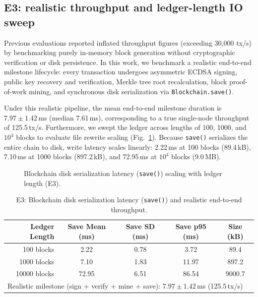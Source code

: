\documentclass[journal]{IEEEtran}
\begin{document}
\subsection{E3: realistic throughput and ledger-length IO sweep}
Previous evaluations reported inflated throughput figures (exceeding 30{,}000 tx/s)
by benchmarking purely in-memory block generation without cryptographic verification
or disk persistence. In this work, we benchmark a realistic end-to-end milestone
lifecycle: every transaction undergoes asymmetric ECDSA signing, public key recovery
and verification, Merkle tree root recalculation, block proof-of-work mining, and
synchronous disk serialization via \texttt{Blockchain.save()}.

Under this realistic pipeline, the mean end-to-end milestone duration is
$7.97\pm1.42$\,ms (median 7.61\,ms), corresponding to a true single-node
throughput of 125.5\,tx/s. Furthermore, we swept the ledger across lengths of
100, 1000, and $10^4$ blocks to evaluate file rewrite scaling (Fig.~\ref{fig:e3}).
Because \texttt{save()} serializes the entire chain to disk, write latency scales
linearly: 2.22\,ms at 100 blocks (89.4\,kB), 7.10\,ms at 1000 blocks (897.2\,kB),
and 72.95\,ms at $10^4$ blocks (9.0\,MB).

\begin{figure}[t]
\centering
{}
\caption{Blockchain disk serialization latency (\texttt{save()}) scaling with ledger length (E3).}
\label{fig:e3}
\end{figure}

\begin{table}[t]
\centering
\caption{E3: Blockchain disk serialization latency (\texttt{save()}) and realistic end-to-end throughput.}
\label{tab:e3}
\footnotesize
\begin{tabular}{@{}rcccc@{}}
\toprule
Ledger Length & Save Mean (ms) & Save SD (ms) & Save p95 (ms) & Size (kB) \\
\midrule
100 blocks & 2.22 & 0.78 & 3.72 & 89.4 \\
1000 blocks & 7.10 & 1.83 & 11.97 & 897.2 \\
10000 blocks & 72.95 & 6.51 & 86.54 & 9000.7 \\
\midrule
\multicolumn{5}{l}{Realistic milestone (sign + verify + mine + save): $7.97\pm1.42$\,ms (125.5\,tx/s)} \\
\bottomrule
\end{tabular}
\end{table}
\end{document}

